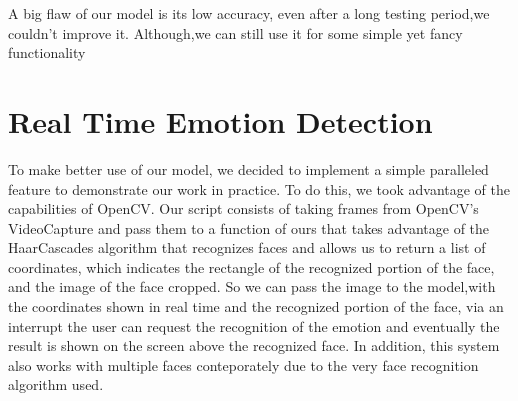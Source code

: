\documentclass{article}
\begin{document}
A big flaw of our model is its low accuracy, even after a long testing period,we couldn't improve it. 
Although,we can still use it for some simple yet fancy functionality
\begin{figure}[htbp]
\centering
{}
\label{fig:final_result_img}
\end{figure}


\section{Real Time Emotion Detection}
To make better use of our model, we decided to implement a simple paralleled feature to demonstrate our work in practice.
To do this, we took advantage of the capabilities of OpenCV.
Our script consists of taking frames from OpenCV's VideoCapture and pass them to a function of ours that takes advantage of the HaarCascades algorithm that recognizes faces and allows us to return a list of coordinates, which indicates the rectangle of the recognized portion of the face, and the image of the face cropped. So we can pass the image to the model,with the coordinates shown in real time and the recognized portion of the face, via an interrupt the user can request the recognition of the emotion and eventually the result is shown on the screen above the recognized face. In addition, this system also works with multiple faces conteporately due to the very face recognition algorithm used.
\begin{figure}[htbp]
\centering
{}
\label{fig:sidequest_img}
\end{figure}
\end{document}
